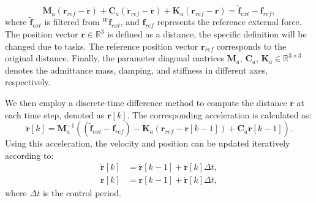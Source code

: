 \begin{equation}
\label{eq:admittance control}
    \boldsymbol{M}_a(\boldsymbol{\ddot{r}}_{ref}-\boldsymbol{\ddot{r}})+\boldsymbol{C}_a(\boldsymbol{\dot{r}}_{ref}-\boldsymbol{\dot{r}})+\boldsymbol{K}_a(\boldsymbol{r}_{ref}-\boldsymbol{r})={\boldsymbol{\tilde{f}}_{ext}}-\boldsymbol{f}_{ref},
\end{equation}
where ${\boldsymbol{\tilde{f}}_{ext}}$ is filtered from ${^W\!\boldsymbol{f}_{ext}}$, and $\boldsymbol{f}_{ref}$ represents the reference external force. The position vector $\boldsymbol{r} \in \mathbb{R}^{3}$ is defined as a distance, the specific definition will be changed due to tasks. The reference position vector $\boldsymbol{r}_{ref}$ corresponds to the original distance.
Finally, the parameter diagonal matrices $\boldsymbol{M}_a$, $\boldsymbol{C}_a$, $\boldsymbol{K}_a \in \mathbb{R}^{3\times3}$ denotes the admittance mass, damping, and stiffness in different axes, respectively.

We then employ a discrete-time difference method to compute the distance $\boldsymbol{r}$ at each time step, denoted as $\boldsymbol{r}[k]$. The corresponding acceleration is calculated as: 
\begin{equation}
\label{eq:difference method1}
\boldsymbol{\ddot{r}}[k]=\boldsymbol{M}^{-1}_a(({\boldsymbol{\tilde{f}}_{ext}}-\boldsymbol{f}_{ref})-\boldsymbol{K}_a(\boldsymbol{r}_{ref}-\boldsymbol{r}[k-1])+\boldsymbol{C}_a\boldsymbol{\dot{r}}[k-1]).
\end{equation}
Using this acceleration, the velocity and position can be updated iteratively according to:
\begin{subequations}
\label{eq:difference method2}
\begin{align}
\boldsymbol{\dot{r}}[k]&=\boldsymbol{\dot{r}}[k-1]+\boldsymbol{\ddot{r}}[k]\Delta t, \\[2pt]
\boldsymbol{r}[k]&=\boldsymbol{r}[k-1]+\boldsymbol{\dot{r}}[k]\Delta t,
\end{align}
\end{subequations}
where $\Delta t$ is the control period.


